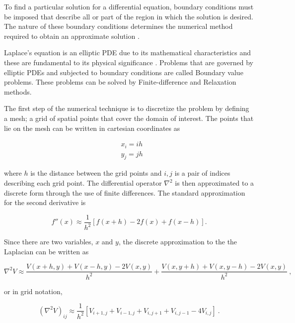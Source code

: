 \documentclass[a4paper]{jpconf}
\begin{document}
To find a particular solution for a differential equation, boundary conditions must be imposed that describe all or part of the region in which the solution is desired. The nature of these boundary conditions determines the numerical method required to obtain an approximate solution \cite{Cheney.Kincai-NumericalMethods}. \par
Laplace's equation is an elliptic PDE due to its mathematical characteristics and these are fundamental to its physical significance \cite{RHB-MathematicalMethods}. Problems that are governed by elliptic PDEs and subjected to boundary conditions are called Boundary value problems.
These problems can be solved by Finite-difference and Relaxation methods. \par

The first step of the numerical technique is to discretize the problem by defining a mesh; a grid of  spatial points that cover the domain of interest. The points that lie on the mesh can be written in cartesian coordinates as 

\begin{subequations}
\begin{align}
&x_i = ih\\ 
&y_j = jh
\end{align}
\label{eq:coord}
\end{subequations} 

\noindent where $h$ is the distance between the grid points and $i,j$ is a pair of indices describing each grid point. The differential operator $\nabla^2$ is then approximated 
to a discrete form through the use of finite differences. The standard approximation for the second derivative is \cite{Cheney.Kincai-NumericalMethods} 

\begin{equation}
f''(x) \approx \frac{1}{h^2}[f(x+h) - 2f(x) + f(x-h)].
\end{equation}

\noindent Since there are two variables, $x$ and $y$, the discrete approximation to the the Laplacian can be written as

\begin{equation}
\nabla^2 V \approx \frac{V(x+h,y) + V(x-h,y) - 2V(x,y)}{h^2} + \frac{V(x,y+h) + V(x,y-h) - 2V(x,y)}{h^2}~,
\end{equation}

\noindent or in grid notation,

\begin{equation}
(\nabla^2 V)_{ij} \approx \frac{1}{h^2}[V_{i+1,j} + V_{i-1,j} + V_{i,j+1} + V_{i,j-1} - 4V_{i,j}]~.
\label{eq:fivepoint}
\end{equation}
\end{document}
